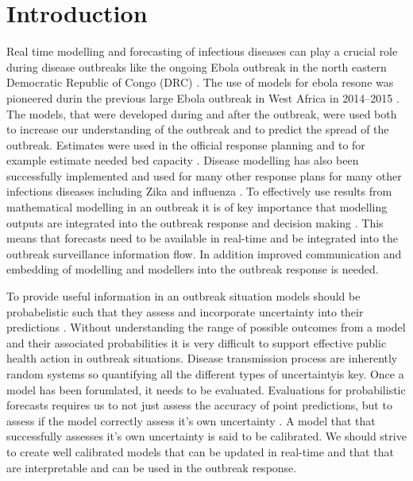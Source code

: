 \documentclass[12pt]{article}
\begin{document}
\newpage

\tableofcontents

\newpage

\section{Introduction}


Real time modelling and forecasting of infectious diseases can play a crucial role during disease outbreaks like the ongoing Ebola outbreak in the north eastern Democratic Republic of Congo (DRC) \cite{heesterbeekModelingInfectiousDisease2015,riversUsingOutbreakScience2019a}. The use of models for ebola resone was pioneered durin the previous large Ebola outbreak in West Africa in 2014--2015 \cite{chretienMathematicalModelingWest}. The models, that were developed during and after the outbreak, were used both to increase our understanding of the outbreak and to predict the spread of the outbreak. Estimates were used in the official response planning \cite{whoebolaresponseteamEbolaVirusDisease2014} and to for example estimate needed bed capacity \cite{camachoTemporalChangesEbola2015}. Disease modelling has also been successfully implemented and used for many other response plans for many other infections diseases including Zika \cite{kobresSystematicReviewEvaluation2019} and influenza \cite{chretienInfluenzaForecastingHuman2014}. To effectively use results from mathematical modelling in an outbreak it is of key importance that modelling outputs are integrated into the outbreak response and decision making \cite{riversUsingOutbreakScience2019a}. This means that forecasts need to be available in real-time and be integrated into the outbreak surveillance information flow. In addition improved communication and embedding of modelling and modellers into the outbreak response is needed. 

To provide useful information in an outbreak situation models should be probabelistic such that they assess and incorporate uncertainty into their predictions \cite{funkAssessingPerformanceRealtime2019, weiCalibrationTestsCount2014,gneitingEditorialProbabilisticForecasting2008}. Without understanding the range of possible outcomes from a model and their associated probabilities it is very difficult to support effective public health action in outbreak situations. Disease transmission process are inherently random systems so quantifying all the different types of uncertaintyis key. Once a model has been forumlated, it needs to be evaluated. Evaluations for probabilistic forecasts requires us to not just assess the accuracy of point predictions, but to assess if the model correctly assess it's own uncertainty \cite{gneitingProbabilisticForecastsCalibration2007, czadoPredictiveModelAssessment2009}. A model that that successfully assesses it's own uncertainty is said to be calibrated. We should strive to create well calibrated models that can be updated in real-time and that that are interpretable and can be used in the outbreak response. 
\end{document}
